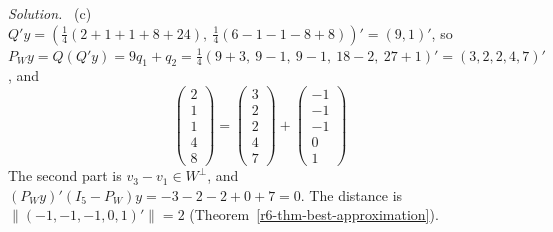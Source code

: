 \documentclass[12pt]{article}
\theoremstyle{definition}
\newenvironment{solution}{\par\noindent\textit{Solution.}\ }{\par\smallskip}
\begin{document}
\begin{solution}
(c) \(Q'y=(\frac14(2+1+1+8+24),\ \frac14(6-1-1-8+8))'=(9,1)'\), so
\(P_Wy=Q(Q'y)=9q_1+q_2=\frac14(9+3,\ 9-1,\ 9-1,\ 18-2,\ 27+1)'=(3,2,2,4,7)'\), and
\[
\begin{pmatrix}2\\1\\1\\4\\8\end{pmatrix}=\begin{pmatrix}3\\2\\2\\4\\7\end{pmatrix}+\begin{pmatrix}-1\\-1\\-1\\0\\1\end{pmatrix}
\]
The second part is \(v_3-v_1\in W^\perp\), and \((P_Wy)'(I_5-P_W)y=-3-2-2+0+7=0\). The distance is
\(\lVert(-1,-1,-1,0,1)'\rVert=2\) (Theorem~\ref{r6-thm-best-approximation}).
\end{solution}
\end{document}
